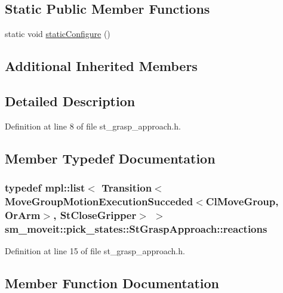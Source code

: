 \subsection*{Static Public Member Functions}
\begin{DoxyCompactItemize}
\item 
static void \hyperlink{structsm__moveit_1_1pick__states_1_1StGraspApproach_a66e75bd4670e13898394a2b27b771a98}{static\+Configure} ()
\end{DoxyCompactItemize}
\subsection*{Additional Inherited Members}


\subsection{Detailed Description}


Definition at line 8 of file st\+\_\+grasp\+\_\+approach.\+h.



\subsection{Member Typedef Documentation}
\subsubsection[{\texorpdfstring{reactions}{reactions}}]{\setlength{\rightskip}{0pt plus 5cm}typedef mpl\+::list$<$ Transition$<${\bf Move\+Group\+Motion\+Execution\+Succeded}$<${\bf Cl\+Move\+Group}, {\bf Or\+Arm}$>$, {\bf St\+Close\+Gripper}$>$ $>$ {\bf sm\+\_\+moveit\+::pick\+\_\+states\+::\+St\+Grasp\+Approach\+::reactions}}\hypertarget{structsm__moveit_1_1pick__states_1_1StGraspApproach_a84f13b04c622425c1b838f339c756d14}{}\label{structsm__moveit_1_1pick__states_1_1StGraspApproach_a84f13b04c622425c1b838f339c756d14}


Definition at line 15 of file st\+\_\+grasp\+\_\+approach.\+h.



\subsection{Member Function Documentation}
